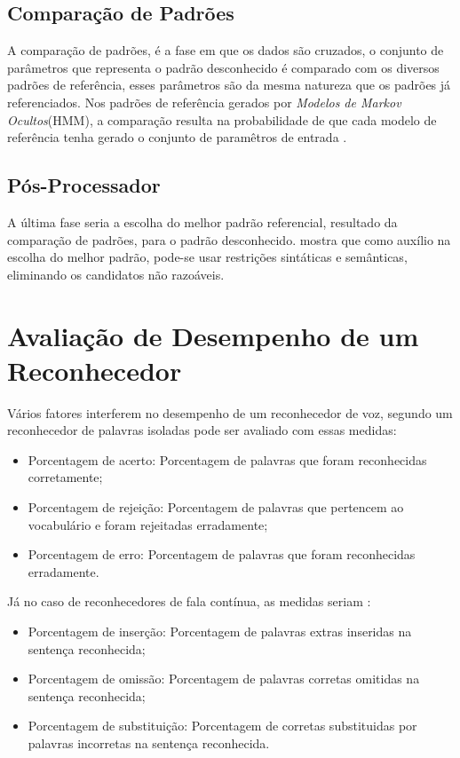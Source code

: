 \subsection{Comparação de Padrões}

A comparação de padrões, é a fase em que os dados são cruzados, o conjunto de parâmetros que representa o padrão desconhecido é comparado com os diversos padrões de referência, esses parâmetros são da mesma natureza que os padrões já referenciados.
Nos padrões de referência gerados por \textit{Modelos de Markov Ocultos}(HMM), a comparação resulta na probabilidade de que cada modelo de referência tenha gerado o conjunto de paramêtros de entrada \cite{AvaliaTecJose}.


\subsection{Pós-Processador}

A última fase seria a escolha do melhor padrão referencial, resultado da comparação de padrões, para o padrão desconhecido.  mostra que como auxílio na escolha do melhor padrão, pode-se usar restrições sintáticas e semânticas, eliminando os candidatos não razoáveis. 

\section{Avaliação de Desempenho de um Reconhecedor}
Vários fatores interferem no desempenho de um reconhecedor de voz, segundo  um reconhecedor de palavras isoladas pode ser avaliado com essas medidas:

\begin{itemize}
\item Porcentagem de acerto: Porcentagem de palavras que foram reconhecidas corretamente;
\item Porcentagem de rejeição: Porcentagem de palavras que pertencem ao vocabulário e foram rejeitadas erradamente;
\item Porcentagem de erro: Porcentagem de palavras que foram reconhecidas erradamente.
\end{itemize}

Já no caso de reconhecedores de fala contínua, as medidas seriam \cite{AvaliaTecJose}:
\begin{itemize}
\item Porcentagem de inserção: Porcentagem de palavras extras inseridas na sentença reconhecida;
\item Porcentagem de omissão: Porcentagem de palavras corretas omitidas na sentença reconhecida;
\item Porcentagem de substituição: Porcentagem de corretas substituidas por palavras incorretas na sentença reconhecida.
\end{itemize}












